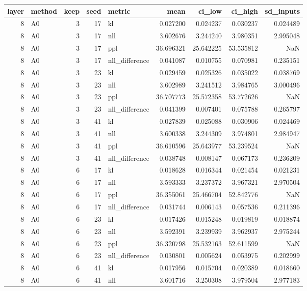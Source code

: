 \begin{tabular}{rlrrlrrrr}
\toprule
layer & method & keep & seed & metric & mean & ci_low & ci_high & sd_inputs \\
\midrule
8 & A0 & 3 & 17 & kl & 0.027200 & 0.024237 & 0.030237 & 0.024489 \\
8 & A0 & 3 & 17 & nll & 3.602676 & 3.244240 & 3.980351 & 2.995048 \\
8 & A0 & 3 & 17 & ppl & 36.696321 & 25.642225 & 53.535812 & NaN \\
8 & A0 & 3 & 17 & nll_difference & 0.041087 & 0.010755 & 0.070981 & 0.235151 \\
8 & A0 & 3 & 23 & kl & 0.029459 & 0.025326 & 0.035022 & 0.038769 \\
8 & A0 & 3 & 23 & nll & 3.602989 & 3.241512 & 3.984765 & 3.000496 \\
8 & A0 & 3 & 23 & ppl & 36.707773 & 25.572358 & 53.772626 & NaN \\
8 & A0 & 3 & 23 & nll_difference & 0.041399 & 0.007401 & 0.075788 & 0.265797 \\
8 & A0 & 3 & 41 & kl & 0.027839 & 0.025088 & 0.030906 & 0.024469 \\
8 & A0 & 3 & 41 & nll & 3.600338 & 3.244309 & 3.974801 & 2.984947 \\
8 & A0 & 3 & 41 & ppl & 36.610596 & 25.643977 & 53.239524 & NaN \\
8 & A0 & 3 & 41 & nll_difference & 0.038748 & 0.008147 & 0.067173 & 0.236209 \\
8 & A0 & 6 & 17 & kl & 0.018628 & 0.016344 & 0.021454 & 0.021231 \\
8 & A0 & 6 & 17 & nll & 3.593333 & 3.237372 & 3.967321 & 2.970504 \\
8 & A0 & 6 & 17 & ppl & 36.355061 & 25.466704 & 52.842776 & NaN \\
8 & A0 & 6 & 17 & nll_difference & 0.031744 & 0.006143 & 0.057536 & 0.211396 \\
8 & A0 & 6 & 23 & kl & 0.017426 & 0.015248 & 0.019819 & 0.018874 \\
8 & A0 & 6 & 23 & nll & 3.592391 & 3.239939 & 3.962937 & 2.975244 \\
8 & A0 & 6 & 23 & ppl & 36.320798 & 25.532163 & 52.611599 & NaN \\
8 & A0 & 6 & 23 & nll_difference & 0.030801 & 0.005624 & 0.053975 & 0.202999 \\
8 & A0 & 6 & 41 & kl & 0.017956 & 0.015704 & 0.020389 & 0.018660 \\
8 & A0 & 6 & 41 & nll & 3.601716 & 3.250308 & 3.979504 & 2.977183 \\

\end{tabular}
